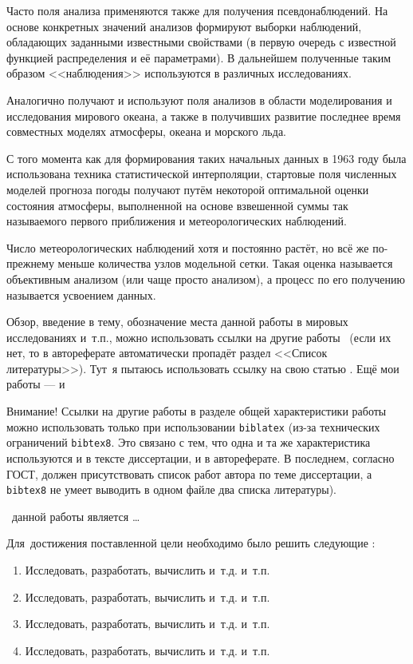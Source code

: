 Часто поля анализа применяются также для получения псевдонаблюдений. На основе конкретных значений анализов формируют выборки наблюдений, обладающих заданными известными свойствами (в первую очередь с известной функцией распределения и её параметрами). В дальнейшем полученные таким образом <<наблюдения>> используются в различных исследованиях.

Аналогично получают и используют поля анализов в области моделирования и исследования мирового океана, а также в получивших развитие последнее время совместных моделях атмосферы, океана и морского льда.

С того момента как для формирования таких начальных данных в 1963 году \cite{Gandin-1963} была использована техника статистической интерполяции, стартовые поля численных моделей прогноза погоды получают путём некоторой оптимальной оценки состояния атмосферы, выполненной на основе взвешенной суммы так называемого первого приближения и метеорологических наблюдений.


Число метеорологических наблюдений хотя и постоянно растёт, но всё же по-прежнему меньше количества узлов модельной сетки. Такая оценка называется объективным анализом (или чаще просто анализом), а процесс по его получению называется усвоением данных.

\newpage
Обзор, введение в тему, обозначение места данной работы в
мировых исследованиях и~т.\:п., можно использовать ссылки на другие
работы~ (если их нет, то в автореферате
автоматически пропадёт раздел <<Список литературы>>).
Тут~я пытаюсь использовать ссылку на свою статью \cite{Mizyak-2013}. Ещё мои работы --- \cite{Slyaeva-2013} и \cite{Tolstykh-2015} 

Внимание! Ссылки
на другие работы в разделе общей характеристики работы можно
использовать только при использовании \verb!biblatex! (из-за технических
ограничений \verb!bibtex8!. Это связано с тем, что одна и та же
характеристика используются и в тексте диссертации, и в
автореферате. В последнем, согласно ГОСТ, должен присутствовать список
работ автора по теме диссертации, а \verb!bibtex8! не умеет выводить в одном
файле два списка литературы).

 \aim\ данной работы является \ldots

Для~достижения поставленной цели необходимо было решить следующие {\tasks}:
\begin{enumerate}
  \item Исследовать, разработать, вычислить и~т.\:д. и~т.\:п.
  \item Исследовать, разработать, вычислить и~т.\:д. и~т.\:п.
  \item Исследовать, разработать, вычислить и~т.\:д. и~т.\:п.
  \item Исследовать, разработать, вычислить и~т.\:д. и~т.\:п.
\end{enumerate}

